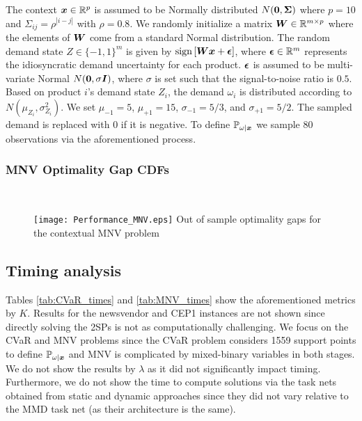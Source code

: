 The context $\boldsymbol{x} \in \mathbb{R}^p$ is assumed to be Normally distributed $N(\boldsymbol{0}, \boldsymbol{\Sigma})$ where $p=10$ and $\Sigma_{ij} = \rho^{|i - j|}$ with $\rho = 0.8$. We randomly initialize a matrix $\boldsymbol{W} \in \mathbb{R}^{m \times p}$ where the elements of $\boldsymbol{W}$ come from a standard Normal distribution. The random demand state $Z \in \{-1,1\}^{m}$ is given by $\text{sign}\left[\boldsymbol{W} \boldsymbol{x} + \boldsymbol{\epsilon}\right]$, where $\boldsymbol{\epsilon} \in \mathbb{R}^m$ represents the idiosyncratic demand uncertainty for each product. $\boldsymbol{\epsilon}$ is assumed to be multi-variate Normal $N(\boldsymbol{0}, \sigma \boldsymbol{I})$, where $\sigma$ is set such that the signal-to-noise ratio is $0.5$. Based on product $i$'s demand state $Z_i$, the demand $\omega_i$ is distributed according to $N(\mu_{Z_i}, \sigma^2_{Z_i})$. We set $\mu_{-1} = 5$, $\mu_{+1} = 15$, $\sigma_{-1} = 5/3$, and $\sigma_{+1} = 5/2$. The sampled demand is replaced with $0$ if it is negative. To define $\mathbb{P}_{\omega | \boldsymbol{x}}$ we sample $80$ observations via the aforementioned process. 


\newpage
\subsubsection{MNV Optimality Gap CDFs}\label{appendix:MNV_performance}
\ \ 
\begin{figure}[H]
\FIGURE
    {\texttt{[image: Performance\_MNV.eps]}}
    {Out of sample optimality gaps for the contextual MNV problem \label{fig:MNV_gaps}}
    {}
\end{figure}



\subsection{Timing analysis }\label{appendix:timing}



Tables \ref{tab:CVaR_times} and \ref{tab:MNV_times} show the aforementioned metrics by $K$. Results for the newsvendor and CEP1 instances are not shown since directly solving the 2SPs is not as computationally challenging. We focus on the CVaR and MNV problems since the CVaR problem considers 1559 support points to define $\mathbb{P}_{\omega | \boldsymbol{x}}$ and MNV is complicated by mixed-binary variables in both stages. We do not show the results by $\lambda$ as it did not significantly impact timing. Furthermore, we do not show the time to compute solutions via the task nets obtained from static and dynamic approaches since they did not vary relative to the MMD task net (as their architecture is the same). 


